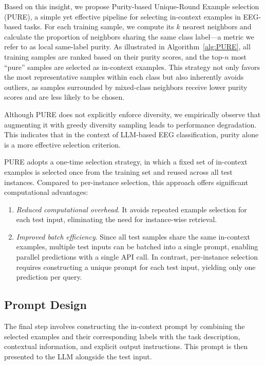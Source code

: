 \documentclass[journal,twocolumn]{IEEEtran}
\begin{document}
Based on this insight, we propose Purity-based Unique-Round Example selection (PURE), a simple yet effective pipeline for selecting in-context examples in EEG-based tasks. For each training sample, we compute its $k$ nearest neighbors and calculate the proportion of neighbors sharing the same class label—a metric we refer to as local same-label purity. As illustrated in Algorithm~\ref{alg:PURE}, all training samples are ranked based on their purity scores, and the top-$n$ most “pure” samples are selected as in-context examples. This strategy not only favors the most representative samples within each class but also inherently avoids outliers, as samples surrounded by mixed-class neighbors receive lower purity scores and are less likely to be chosen.

Although PURE does not explicitly enforce diversity, we empirically observe that augmenting it with greedy diversity sampling leads to performance degradation. This indicates that in the context of LLM-based EEG classification, purity alone is a more effective selection criterion.

PURE adopts a one-time selection strategy, in which a fixed set of in-context examples is selected once from the training set and reused across all test instances. Compared to per-instance selection, this approach offers significant computational advantages:

\begin{enumerate}
  \item \emph{Reduced computational overhead}. It avoids repeated example selection for each test input, eliminating the need for instance-wise retrieval.
  \item \emph{Improved batch efficiency}. Since all test samples share the same in-context examples, multiple test inputs can be batched into a single prompt, enabling parallel predictions with a single API call. In contrast, per-instance selection requires constructing a unique prompt for each test input, yielding only one prediction per query.
\end{enumerate}

\subsection{Prompt Design}

The final step involves constructing the in-context prompt by combining the selected examples and their corresponding labels with the task description, contextual information, and explicit output instructions. This prompt is then presented to the LLM alongside the test input.
\end{document}
